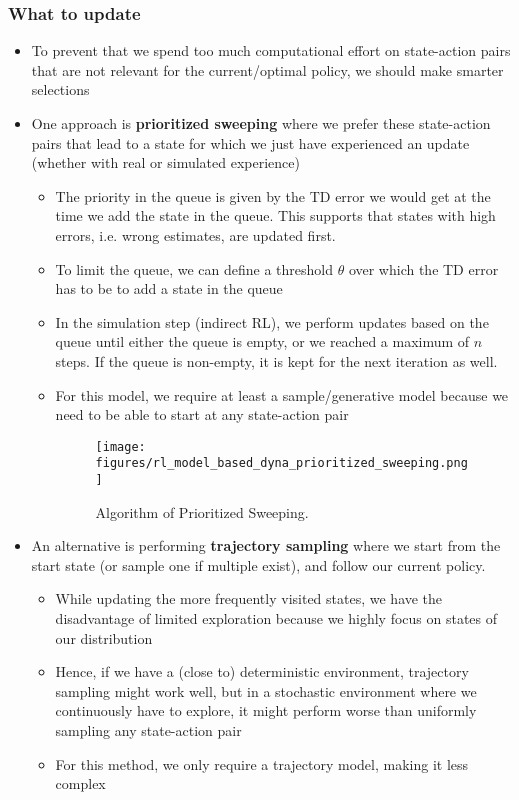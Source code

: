\subsubsection{What to update}
\begin{itemize}
	\item To prevent that we spend too much computational effort on state-action pairs that are not relevant for the current/optimal policy, we should make smarter selections
	\item One approach is \textbf{prioritized sweeping} where we prefer these state-action pairs that lead to a state for which we just have experienced an update (whether with real or simulated experience)
	\begin{itemize}
		\item The priority in the queue is given by the TD error we would get at the time we add the state in the queue. This supports that states with high errors, i.e. wrong estimates, are updated first.
		\item To limit the queue, we can define a threshold $\theta$ over which the TD error has to be to add a state in the queue
		\item In the simulation step (indirect RL), we perform updates based on the queue until either the queue is empty, or we reached a maximum of $n$ steps. If the queue is non-empty, it is kept for the next iteration as well.
		\item For this model, we require at least a sample/generative model because we need to be able to start at any state-action pair
		\begin{figure}[ht!]
			\centering
			\texttt{[image: figures/rl\_model\_based\_dyna\_prioritized\_sweeping.png]}
			\caption{Algorithm of Prioritized Sweeping.}
		\end{figure}
	\end{itemize}
	\item An alternative is performing \textbf{trajectory sampling} where we start from the start state (or sample one if multiple exist), and follow our current policy. 
	\begin{itemize}
		\item While updating the more frequently visited states, we have the disadvantage of limited exploration because we highly focus on states of our distribution
		\item Hence, if we have a (close to) deterministic environment, trajectory sampling might work well, but in a stochastic environment where we continuously have to explore, it might perform worse than uniformly sampling any state-action pair 
		\item For this method, we only require a trajectory model, making it less complex
	\end{itemize}
\end{itemize}
